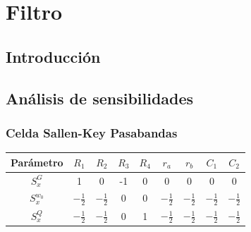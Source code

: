 \documentclass[../tc_tpfinal_main.tex]{subfiles}
\begin{document}
\chapter{Filtro}

\section{Introducción}

\section{Análisis de sensibilidades}
\subsection{Celda Sallen-Key Pasabandas}

			 	\begin{table}[H] 
				\centering
 				\begin{tabular}{||c c c c c c c c c||} 
 					\hline
				  Parámetro& $R_1$ & $R_2$ & $R_3$ & $R_4$ & $r_a$ & $r_b$&$C_1$&$C_2$\\ [0.5ex] 
 					\hline\hline
					 $S^G_x$& 1 & 0& -1& 0&0&0&0&0\\
					 $S^{w_0}_x$& $- \frac{1}{2}$ &$- \frac{1}{2}$& 0& 0&$- \frac{1}{2}$&$- \frac{1}{2}$&$- \frac{1}{2}$&$- \frac{1}{2}$\\
					 $S^{Q}_x$&$- \frac{1}{2}$ &$- \frac{1}{2}$& 0& 1&$- \frac{1}{2}$&$- \frac{1}{2}$&$- \frac{1}{2}$&$- \frac{1}{2}$\\[1ex] 
					\hline
				\end{tabular}
			\end{table}
\end{document}

